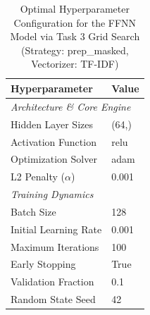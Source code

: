\begin{table}[H]
    \centering
    \caption{Optimal Hyperparameter Configuration for the FFNN Model via Task 3 Grid Search (Strategy: prep_masked, Vectorizer: TF-IDF)}
    \label{tab:task3_ffnn_hyperparameters}
    \small
    \begin{tabular}{ll}
    \toprule
    \textbf{Hyperparameter} & \textbf{Value} \\
    \midrule
    \multicolumn{2}{l}{\textit{Architecture \& Core Engine}} \\
    Hidden Layer Sizes & (64,) \\
    Activation Function & relu \\
    Optimization Solver & adam \\
    L2 Penalty ($\alpha$) & 0.001 \\
    \midrule
    \multicolumn{2}{l}{\textit{Training Dynamics}} \\
    Batch Size & 128 \\
    Initial Learning Rate & 0.001 \\
    Maximum Iterations & 100 \\
    Early Stopping & True \\
    Validation Fraction & 0.1 \\
    Random State Seed & 42 \\
    \bottomrule
    \end{tabular}
    \end{table}
